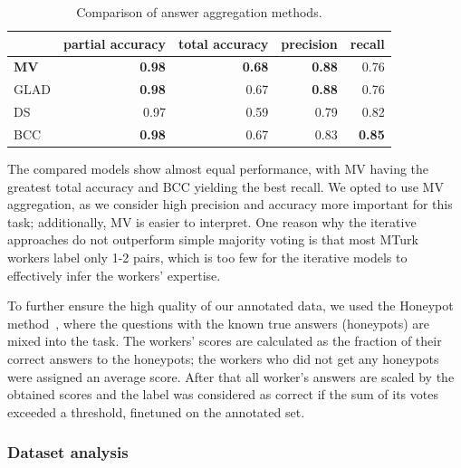 \begin{table}[]
    \centering
    \begin{adjustbox}{width=0.6\textwidth}
    \begin{tabular}{@{}lrrrr@{}}
            & \textbf{partial accuracy} & \textbf{total accuracy} & \textbf{precision} & \textbf{recall} \\ \toprule
\textbf{MV} & \textbf{0.98}                    & \textbf{0.68}                  & \textbf{0.88}                 & 0.76             \\
GLAD        & \textbf{0.98}                             & 0.67                           & \textbf{0.88}                          & 0.76                       \\
DS          & 0.97                             & 0.59                           & 0.79                          & 0.82                       \\
BCC         & \textbf{0.98}                             & 0.67                           & 0.83                          & \textbf{0.85}                      
\end{tabular}
    \end{adjustbox}
    \caption{Comparison of answer aggregation methods.}
\label{tab:aggregation}
\end{table}

The compared models show almost equal performance, with MV having the greatest total accuracy and BCC yielding the best recall. We opted to use MV aggregation, as we consider high precision and accuracy more important for this task; additionally, MV is easier to interpret. One reason why the iterative approaches do not outperform simple majority voting is that most MTurk workers label only 1-2 pairs, which is too few for the iterative models to effectively infer the workers' expertise.

To further ensure the high quality of our annotated data,
we used the Honeypot method~\cite{lee2010social}, where the questions with the known true answers (honeypots) are mixed into the task. The workers' scores are calculated as the fraction of their correct answers to the honeypots; the workers who did not get any honeypots were assigned an average score. After that all worker's answers are scaled by the obtained scores and the label was considered as correct if the sum of its votes exceeded a threshold, finetuned on the annotated set.

\subsubsection{Dataset analysis}

